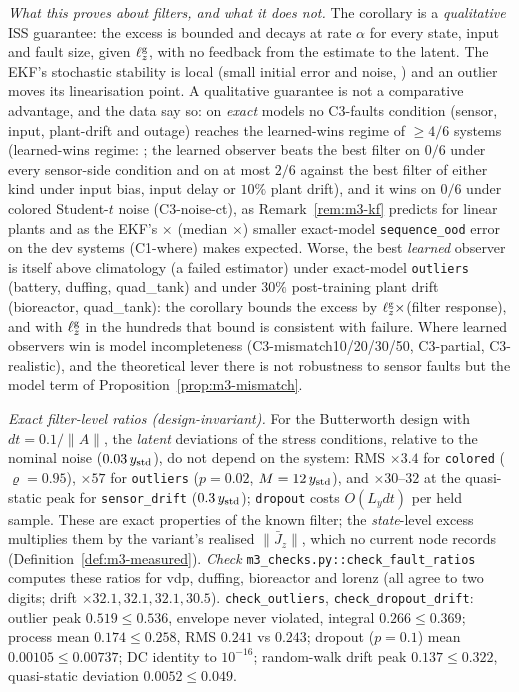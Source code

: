 \emph{What this proves about filters, and what it does not.} The corollary is a \emph{qualitative} ISS guarantee: the
excess is bounded and decays at rate $\alpha$ for every state, input and fault size, given $\ell^{\rm g}_z$, with no
feedback from the estimate to the latent. The EKF's stochastic stability is local (small initial error and noise,
\citealp{reif1999stochastic}) and an outlier moves its linearisation point. A qualitative guarantee is not a comparative
advantage, and the data say so: on \emph{exact} models no C3-faults condition (sensor, input, plant-drift and outage)
reaches the learned-wins regime of $\ge4/6$ systems (learned-wins regime: \CthreeFaultsRegimes; the learned observer
beats the best filter on $0/6$ under every sensor-side condition and on at most $2/6$ against the best filter of either
kind under input bias, input delay or $10\%$ plant drift), and it wins on $0/6$ under colored Student-$t$ noise
(C3-noise-ct), as Remark~\ref{rem:m3-kf} predicts for linear plants and as the EKF's
\ConeLearnedOverEkfRangeSeq$\times$ (median \ConeLearnedOverEkfMedianSeq$\times$) smaller exact-model
\texttt{sequence\_ood} error on the dev systems (C1-where) makes expected. Worse, the best \emph{learned}
observer is itself above climatology (a failed estimator) under exact-model \texttt{outliers} (battery, duffing,
quad\_tank) and under $30\%$ post-training plant drift (bioreactor, quad\_tank): the corollary bounds the excess by
$\ell^{\rm g}_z\times$(filter response), and with $\ell^{\rm g}_z$ in the hundreds that bound is consistent with failure.
Where learned observers win is model incompleteness (C3-mismatch10/20/30/50, C3-partial, C3-realistic), and the
theoretical lever there is not robustness to sensor faults but the model term of Proposition~\ref{prop:m3-mismatch}.

\emph{Exact filter-level ratios (design-invariant).} For the Butterworth design with $dt=0.1/\|A\|$,
the \emph{latent} deviations of the stress conditions, relative to the nominal noise
($0.03\,y_{\rm std}$), do not depend on the system: RMS $\times3.4$ for \texttt{colored}
($\varrho=0.95$), $\times57$ for \texttt{outliers} ($p=0.02$, $M=12\,y_{\rm std}$), and $\times30$--$32$
at the quasi-static peak for \texttt{sensor\_drift} ($0.3\,y_{\rm std}$); \texttt{dropout} costs
$O(L_ydt)$ per held sample. These are exact properties of the known filter; the \emph{state}-level excess multiplies
them by the variant's realised $\|\bar J_z\|$, which no current node records (Definition~\ref{def:m3-measured}).
\emph{Check} \texttt{m3\_checks.py::check\_fault\_ratios} computes these ratios for vdp, duffing,
bioreactor and lorenz (all agree to two digits; drift $\times32.1,32.1,32.1,30.5$).
\texttt{check\_outliers}, \texttt{check\_dropout\_drift}: outlier peak $0.519\le0.536$, envelope never
violated, integral $0.266\le0.369$; process mean $0.174\le0.258$, RMS $0.241$ vs $0.243$; dropout
($p=0.1$) mean $0.00105\le0.00737$; DC identity to $10^{-16}$; random-walk drift peak $0.137\le0.322$,
quasi-static deviation $0.0052\le0.049$.

